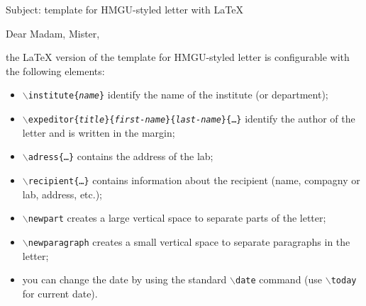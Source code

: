 \documentclass[a4paper,10pt,twosided]{letter}
\date{\today}
\begin{document}



	
	\newpart

	Subject: template for HMGU-styled letter with \LaTeX{}
	
	\newpart

	Dear Madam, Mister,

	\newpart

	the \LaTeX{} version of the template for HMGU-styled letter is configurable with the following elements:
	\begin{itemize}
		\item \texttt{$\backslash{}$institute\{\textit{name}\}} identify the name of the institute (or department);
		\item \texttt{$\backslash{}$expeditor\{\textit{title}\}\{\textit{first-name}\}\{\textit{last-name}\}\{\dots\}} identify the author of the letter and is written in the margin;
		\item \texttt{$\backslash{}$adress\{\dots\}} contains the address of the lab;
		\item \texttt{$\backslash{}$recipient\{\dots\}} contains information about the recipient (name, compagny or lab, address, etc.);
		\item \texttt{$\backslash{}$newpart} creates a large vertical space to separate parts of the letter;
		\item \texttt{$\backslash{}$newparagraph} creates a small vertical space to separate paragraphs in the letter;
		\item you can change the date by using the standard \texttt{$\backslash{}$date} command (use \texttt{$\backslash$today} for current date).
	\end{itemize}
\end{document}

